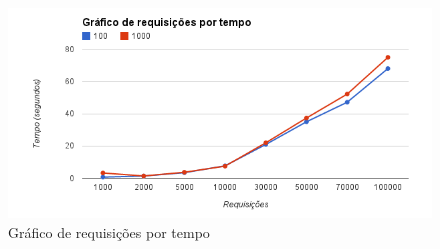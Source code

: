     \begin{figure}[htb]
    \centering
    \includegraphics[scale=0.7]{images/reqxtempo.png}
    \caption{Gráfico de requisições por tempo}
    \label{fig: Gráfico de requisições por tempo}
    \end{figure}

